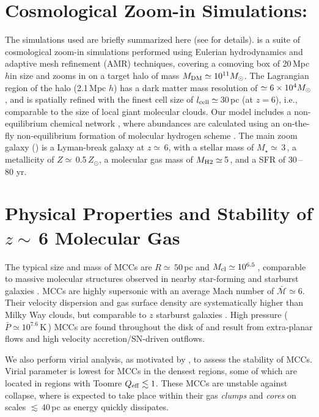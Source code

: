 \documentclass{iau}
\begin{document}
\vspace{-1.em}
\section{Cosmological Zoom-in Simulations:  } 

The simulations used are briefly summarized here (see \citealt{Pallottini17a, Pallottini17b} for details).
 is a suite of cosmological zoom-in simulations performed using Eulerian hydrodynamics and adaptive mesh refinement (AMR) techniques, 
covering a comoving box of 20\,Mpc $h$\pmOne in size and zooms in on a target halo of mass $M_{\rm DM}\simeq10^{11} \mbox{$M_{\odot}$}$. 
The Lagrangian region of the halo (2.1\,Mpc $h$\pmOne) has a dark matter mass resolution of $\simeq 6\times 10^4 \mbox{$M_{\odot}$}$, 
and is spatially refined with the finest cell size of $l_{\rm cell}\simeq$\,30\,pc (at $z = 6$), i.e., comparable to the size of local giant molecular clouds.
Our model includes a non-equilibrium chemical network \citep{Grassi14a,Bovino16a}, where 
abundances are calculated using an on-the-fly non-equilibrium formation of molecular hydrogen scheme \citep{Pallottini17a}.
The main zoom galaxy (\flower) is a Lyman-break galaxy at $z\simeq$\,6, with a stellar mass of $M_\star\simeq$\,3\,\Msun, a metallicity of $Z\simeq$\,0.5\,$Z_{\odot}$, a molecular gas mass of $M_{\rm H2}\simeq$\,5\,\Msun, and a SFR of 30\,--\,80\,\Msun\,yr\pmOne.

\vspace{-1.2em}
\section{Physical Properties and Stability of $z\sim$\,6 Molecular Gas}

The typical size and mass of MCCs are $R\simeq\,50$\,pc and $M_{\rm cl}\simeq10^{6.5}$\,\Msun, comparable to massive molecular structures observed 
in nearby star-forming and starburst galaxies \citep[e.g.,][]{Leroy15a}.
MCCs are highly supersonic with an average Mach number of $\bar{\mathcal{M}}\simeq6$.
Their velocity dispersion and gas surface density are systematically higher than Milky Way clouds, but comparable to $z$ starburst galaxies
\citep[e.g.,][]{Swinbank11a}.
High pressure ($\bar{P}\simeq10^{7.6}$\,K\,\cc) MCCs are found throughout the disk of \flower and
result from extra-planar flows and high velocity accretion/SN-driven outflows.

We also perform virial analysis, as motivated by \obs, to assess the stability of MCCs. 
Virial parameter is lowest for MCCs in the densest regions, some of which are located in regions with 
Toomre $Q_{\rm eff}\lesssim1$. These MCCs are unstable against collapse, where \SF is expected to take place within 
their gas {\it clumps} and {\it cores} on scales $\lesssim$\,40\,pc as energy quickly dissipates.
\end{document}
